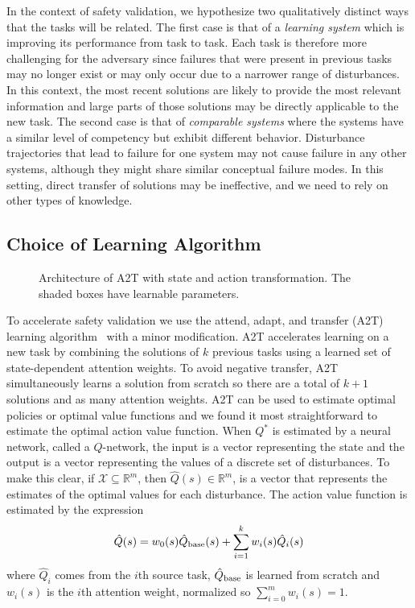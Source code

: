 In the context of safety validation, we hypothesize two qualitatively distinct ways that the tasks will be related. The first case is that of a \emph{learning system} which is improving its performance from task to task. Each task is therefore more challenging for the adversary since failures that were present in previous tasks may no longer exist or may only occur due to a narrower range of disturbances. In this context, the most recent solutions are likely to provide the most relevant information and large parts of those solutions may be directly applicable to the new task. The second case is that of \emph{comparable systems} where the systems have a similar level of competency but exhibit different behavior. Disturbance trajectories that lead to failure for one system may not cause failure in any other systems, although they might share similar conceptual failure modes. In this setting, direct transfer of solutions may be ineffective, and we need to rely on other types of knowledge. 


\subsection{Choice of Learning Algorithm}
\begin{figure}
\centering
\resizebox{0.7\columnwidth}{!}{}
\caption{Architecture of A2T with state and action transformation. The shaded boxes have learnable parameters. }
\label{fig:a2t_architecture}
\end{figure}

To accelerate safety validation we use the attend, adapt, and transfer (A2T) learning algorithm~\cite{rajendran2017attend} with a minor modification. A2T accelerates learning on a new task by combining the solutions of $k$ previous tasks using a learned set of state-dependent attention weights. To avoid negative transfer, A2T simultaneously learns a solution from scratch so there are a total of $k+1$ solutions and as  many attention weights. A2T can be used to estimate optimal policies or optimal value functions and we found it most straightforward to estimate the optimal action value function. When $Q^*$ is estimated by a neural network, called a $Q$-network, the input is a vector representing the state and the output is a vector representing the values of a discrete set of disturbances. To make this clear, if $\mathcal{X} \subseteq \mathbb{R}^m$, then $\hat{Q}(s) \in \mathbb{R}^m$, is a vector that represents the estimates of the optimal values for each disturbance. The action value function is estimated by the expression
\begin{equation}
\hat{Q}(s) = w_0(s) \hat{Q}_{\rm base}(s) + \sum_{i=1}^k w_i(s) \hat{Q}_i(s) \label{eq:A2T}
\end{equation}
where $\hat{Q}_i$ comes from the $i$th source task, $\hat{Q}_{\rm base}$ is learned from scratch and $w_i(s)$ is the $i$th attention weight, normalized so $\sum_{i=0}^m w_i(s) = 1$.


